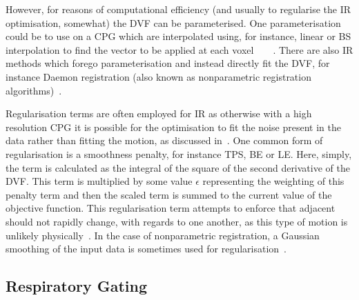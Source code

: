                 However, for reasons of computational efficiency (and usually to regularise the \gls{IR} optimisation, somewhat) the \gls{DVF} can be parameterised. One parameterisation could be to use  on a \gls{CPG} which are interpolated using, for instance, linear or \gls{BS} interpolation to find the vector to be applied at each voxel~~~~. There are also \gls{IR} methods which forego parameterisation and instead directly fit the \gls{DVF}, for instance Daemon registration (also known as nonparametric registration algorithms)~.
                
                Regularisation terms are often employed for  \gls{IR} as otherwise with a high resolution \gls{CPG} it is possible for the optimisation to fit the noise present in the data rather than fitting the motion, as discussed in~. One common form of regularisation is a smoothness penalty, for instance \gls{TPS}, \gls{BE} or \gls{LE}. Here, simply, the term is calculated as the integral of the square of the second derivative of the \gls{DVF}. This term is multiplied by some value $\epsilon$ representing the weighting of this penalty term and then the scaled term is summed to the current value of the objective function. This regularisation term attempts to enforce that adjacent  should not rapidly change, with regards to one another, as this type of motion is unlikely physically~. In the case of nonparametric registration, a Gaussian smoothing of the input data is sometimes used for regularisation~.
        
        \subsection{Respiratory Gating} \label{sec:respiratory_gating}
            
